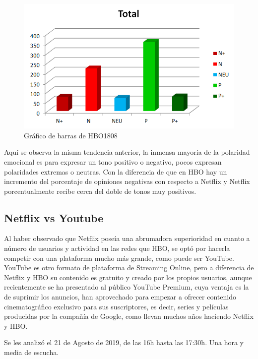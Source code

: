 \begin{figure}[H]
	\centering
	\includegraphics[scale=1]{imagenes/barrasHBO1808.PNG}
	\caption{Gráfico de barras de HBO1808}
	\label{fig:barrasHBO1808}
\end{figure}


Aquí se observa la misma tendencia anterior, la inmensa mayoría de la polaridad emocional es para expresar un tono positivo o negativo, pocos expresan polaridades extremas o neutras. Con la diferencia de que en HBO hay un incremento del porcentaje de opiniones negativas con respecto a Netflix y Netflix porcentualmente recibe cerca del doble de tonos muy positivos. 


\subsection{Netflix vs Youtube}

Al haber observado que Netflix poseía una abrumadora superioridad en cuanto a número de usuarios y actividad en las redes que HBO, se optó por hacerla competir con una plataforma mucho más grande, como puede ser YouTube. YouTube es otro formato de plataforma de Streaming Online, pero a diferencia de Netflix y HBO su contenido es gratuito y creado por los propios usuarios, aunque recientemente se ha presentado al público YouTube Premium, cuya ventaja es la de suprimir los anuncios, han aprovechado para empezar a ofrecer contenido cinematográfico exclusivo para sus suscriptores, es decir, series y películas producidas por la compañía de Google, como llevan muchos años haciendo Netflix y HBO. 

Se les analizó el 21 de Agosto de 2019, de las 16h hasta las 17:30h. Una hora y media de escucha.



